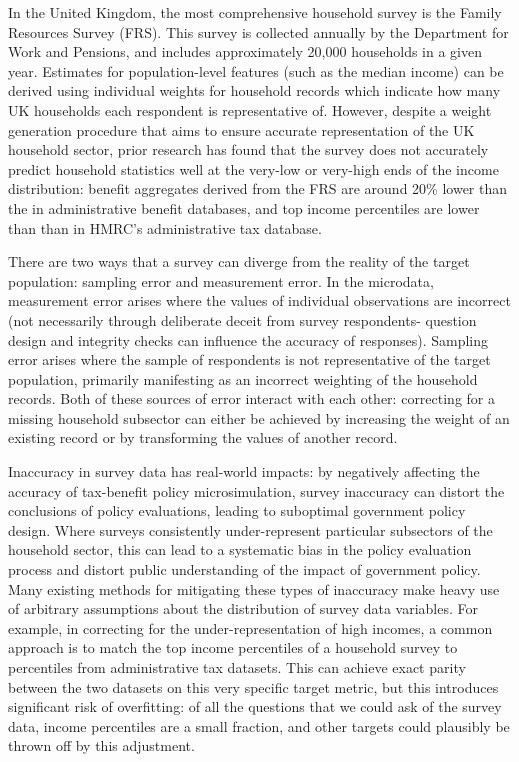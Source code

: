 \documentclass[10pt,journal,compsoc]{IEEEtran}
\begin{document}
In the United Kingdom, the most comprehensive household survey is the Family Resources Survey (FRS). This survey is collected annually by the Department for Work and Pensions, and includes approximately 20,000 households in a given year. Estimates for population-level features (such as the median income) can be derived using individual weights for household records which indicate how many UK households each respondent is representative of. However, despite a weight generation procedure that aims to ensure accurate representation of the UK household sector, prior research has found that the survey does not accurately predict household statistics well at the very-low or very-high ends of the income distribution: benefit aggregates derived from the FRS are around 20\% lower than the in administrative benefit databases, and top income percentiles are lower than than in HMRC's administrative tax database.

There are two ways that a survey can diverge from the reality of the target population: sampling error and measurement error. In the microdata, measurement error arises where the values of individual observations are incorrect (not necessarily through deliberate deceit from survey respondents- question design and integrity checks can influence the accuracy of responses). Sampling error arises where the sample of respondents is not representative of the target population, primarily manifesting as an incorrect weighting of the household records. Both of these sources of error interact with each other: correcting for a missing household subsector can either be achieved by increasing the weight of an existing record or by transforming the values of another record.

Inaccuracy in survey data has real-world impacts: by negatively affecting the accuracy of tax-benefit policy microsimulation, survey inaccuracy can distort the conclusions of policy evaluations, leading to suboptimal government policy design. Where surveys consistently under-represent particular subsectors of the household sector, this can lead to a systematic bias in the policy evaluation process and distort public understanding of the impact of government policy. Many existing methods for mitigating these types of inaccuracy make heavy use of arbitrary assumptions about the distribution of survey data variables. For example, in correcting for the under-representation of high incomes, a common approach is to match the top income percentiles of a household survey to percentiles from administrative tax datasets. This can achieve exact parity between the two datasets on this very specific target metric, but this introduces significant risk of overfitting: of all the questions that we could ask of the survey data, income percentiles are a small fraction, and other targets could plausibly be thrown off by this adjustment.
\end{document}
